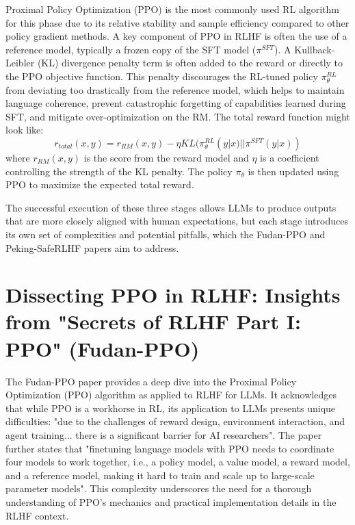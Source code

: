 \documentclass{article} %
\begin{document}
Proximal Policy Optimization (PPO) \cite{Zheng2023PPO, Dai2023SafeRLHF} is the most commonly used RL algorithm for this phase due to its relative stability and sample efficiency compared to other policy gradient methods. A key component of PPO in RLHF is often the use of a reference model, typically a frozen copy of the SFT model ($\pi^{SFT}$). A Kullback-Leibler (KL) divergence penalty term is often added to the reward or directly to the PPO objective function. This penalty discourages the RL-tuned policy $\pi_\theta^{RL}$ from deviating too drastically from the reference model, which helps to maintain language coherence, prevent catastrophic forgetting of capabilities learned during SFT, and mitigate over-optimization on the RM. \cite{Zheng2023PPO} The total reward function might look like:
$$ r_{total}(x,y) = r_{RM}(x,y) - \eta KL(\pi_\theta^{RL}(y|x) |
| \pi^{SFT}(y|x)) $$
where $r_{RM}(x,y)$ is the score from the reward model and $\eta$ is a coefficient controlling the strength of the KL penalty. The policy $\pi_\theta$ is then updated using PPO to maximize the expected total reward.

The successful execution of these three stages allows LLMs to produce outputs that are more closely aligned with human expectations, but each stage introduces its own set of complexities and potential pitfalls, which the Fudan-PPO and Peking-SafeRLHF papers aim to address.

\section{Dissecting PPO in RLHF: Insights from "Secrets of RLHF Part I: PPO" (Fudan-PPO)}
\label{sec:fudan_ppo}

The Fudan-PPO paper \cite{Zheng2023PPO} provides a deep dive into the Proximal Policy Optimization (PPO) algorithm as applied to RLHF for LLMs. It acknowledges that while PPO is a workhorse in RL, its application to LLMs presents unique difficulties: "due to the challenges of reward design, environment interaction, and agent training... there is a significant barrier for AI researchers". \cite{Zheng2023PPO} The paper further states that "finetuning language models with PPO needs to coordinate four models to work together, i.e., a policy model, a value model, a reward model, and a reference model, making it hard to train and scale up to large-scale parameter models". \cite{Zheng2023PPO} This complexity underscores the need for a thorough understanding of PPO's mechanics and practical implementation details in the RLHF context.
\end{document}
